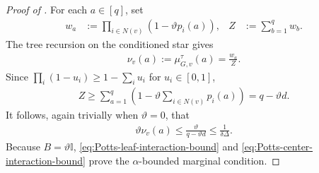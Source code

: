\documentclass[10pt,a4paper]{amsart}
\newcommand{\tp}{\tuple}
\newcommand{\tuple}[1]{\left(#1\right)}
\begin{document}
\begin{proof}[Proof of ]
For each $\!a\in[q]$, set
\begin{align*}
  w_{\!a}
  &:=%
  \prod_{i\in N(v)}\tp{1-\vartheta p_i(\!a)},
  &
  Z&:=\sum_{\!b=1}^q w_{\!b}.
\end{align*}
The tree recursion on the conditioned star gives
\begin{align*}
  \nu_v(\!a)
  :=
  \mu^\tau_{G,v}(\!a)
  =
  \frac{w_{\!a}}Z.
\end{align*}
Since $\prod_i(1-u_i)\geq1-\sum_i u_i$ for $u_i\in[0,1]$,
\begin{align*}
  Z
  \geq
  \sum_{\!a=1}^q\tp{1-\vartheta\sum_{i\in N(v)}p_i(\!a)}
  =q-\vartheta d.
\end{align*}
It follows, again trivially when $\vartheta=0$, that
\begin{align}
  \vartheta\nu_v(\!a)
  \leq
  \frac{\vartheta}{q-\vartheta d}
  \leq
  \frac1{\delta\Delta}.
  \label{eq:Potts-center-interaction-bound}
\end{align}
Because $B=\vartheta\mathbb I$, \eqref{eq:Potts-leaf-interaction-bound}
and \eqref{eq:Potts-center-interaction-bound} prove the
$\alpha$-bounded marginal condition.


\end{proof}
\end{document}

